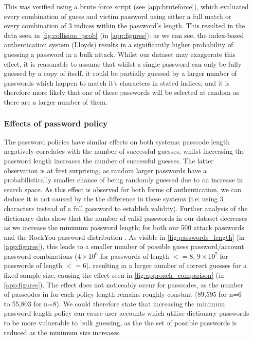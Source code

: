 \documentclass[british,11pt,a4paper]{article}
\begin{document}
This was verified using a brute force script (see \autoref{app:bruteforce}), which evaluated every combination of guess and victim password using either a full match or every combination of 3 indices within the password's length. This resulted in the data seen in \autoref{fig:collision_prob} (in \autoref{app:figures}): as we can see, the index-based authentication system (Lloyds) results in a significantly higher probability of guessing a password in a bulk attack. Whilst our dataset may exaggerate this effect, it is reasonable to assume that whilst a single password can only be fully guessed by a copy of itself, it could be partially guessed by a larger number of passwords which happen to match it's characters in stated indices, and it is therefore more likely that one of these passwords will be selected at random as there are a larger number of them. 


\subsubsection{Effects of password policy}
The password policies have similar effects on both systems: passcode length negatively correlates with the number of successful guesses, whilst increasing the password length increases the number of successful guesses. The latter observation is at first surprising, as random larger passwords have a probabilistically smaller chance of being randomly guessed due to an increase in search space. As this effect is observed for both forms of authentication, we can deduce it is not caused by the the difference in these systems (i.e: using 3 characters instead of a full password to establish validity). Further analysis of the dictionary data show that the number of valid passwords in our dataset decreases as we increase the minimum password length; for both our 500 attack passwords and the RockYou password distribution \cite{Cubrilovic2009-wu}. As visible in \autoref{fig:passwords_length} (in \autoref{app:figures}), this leads to a smaller number of possible guess password/account password combinations ($4 \times 10^6 $ for  passwords  of length $<= 8$, $9 \times 10^7$ for passwords of length $<= 6$), resulting in a larger number of correct guesses for a fixed sample size, causing the effect seen in \autoref{fig:approach_comparison} (in \autoref{app:figures}). The effect does not noticeably occur for passcodes, as the number of passcodes in \cite{Cubrilovic2009-wu} for each policy length remains roughly constant (89,595 for n=6 to 55,803 for n=8). We could therefore state that increasing the minimum password length policy can cause user accounts which utilise dictionary passwords to be more vulnerable to bulk guessing, as the the set of possible passwords is reduced as the minimum size increases.
\end{document}
